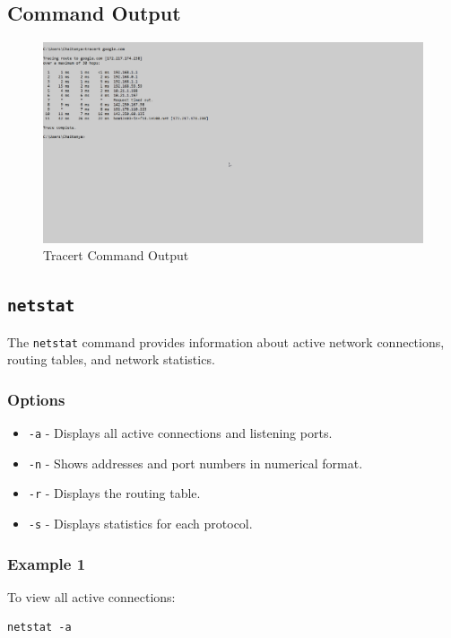 \documentclass{article}
\begin{document}
\subsection{Command Output}
\begin{figure}[htbp]
    \centering
    \includegraphics[]{traceroute_output.png}
    \caption{Tracert Command Output}
    \label{fig:tracert_output}
\end{figure}
\clearpage  %
\subsection{\texttt{netstat}}
The \texttt{netstat} command provides information about active network connections, routing tables, and network statistics.

\subsubsection{Options}
\begin{itemize}
    \item \texttt{-a} - Displays all active connections and listening ports.
    \item \texttt{-n} - Shows addresses and port numbers in numerical format.
    \item \texttt{-r} - Displays the routing table.
    \item \texttt{-s} - Displays statistics for each protocol.
\end{itemize}

\subsubsection{Example 1}
To view all active connections:
\begin{verbatim}
netstat -a
\end{verbatim}
\end{document}
